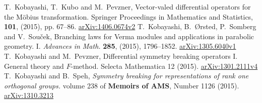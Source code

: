 \documentclass[a4paper,12pt,reqno]{amsart}
\numberwithin{theorem}{subsection}
\numberwithin{equation}{section}
\begin{document}
\begin{thebibliography}{KOSS15}
T.~Kobayashi, T.~Kubo and M.~Pevzner, Vector-valed differential operators for
the M\"{o}bius transformation. Springer Proceedings in Mathematics and Statistics,
{\bf 101}, (2015), pp. 67--86. \url{arXiv:1406.0674v2}
T.~Kobayashi, B.~{\O}rsted, P.~Somberg and V.~Sou\v{c}ek, Branching laws for Verma
modules and applications in parabolic geometry. I. {\em Advances in Math.} {\bf
285}, (2015), 1796--1852. \url{arXiv:1305.6040v1}
T.~Kobayashi and M.~Pevzner, Differential symmetry breaking operators I.
General theory and $F$-method. Selecta Mathematica 12 (2015).
\url{arXiv:1301.2111v4}
T.~Kobayashi and B.~Speh, {\em Symmetry breaking for representations
of rank one orthogonal groups.} volume 238 of {\bf Memoirs of AMS},
Number 1126 (2015). \url{arXiv:1310.3213}
\end{thebibliography}
\end{document}
